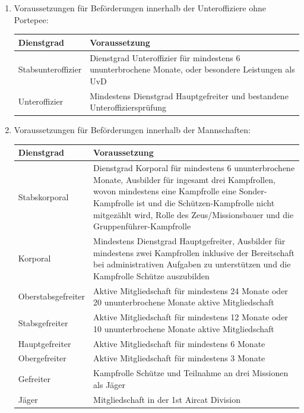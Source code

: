 \begin{enumerate}[label=(\arabic*)]
\begin{enumerate}[label=(\Alph*)]
\begin{center}
\begin{tabular}{|p{4cm}|p{8cm}|}
        \hline
        \end{tabular}
        \end{center}
        \item Voraussetzungen für Beförderungen innerhalb der Unteroffiziere ohne Portepee:
        \begin{center}
        \begin{tabular}{|p{4cm}|p{8cm}|}
        \hline
        \textbf{Dienstgrad} & \textbf{Voraussetzung} \\
        \hline
        Stabsunteroffizier & Dienstgrad Unteroffizier für mindestens 6 ununterbrochene Monate, oder besondere Leistungen als UvD \\
        \hline
        Unteroffizier & Mindestens Dienstgrad Hauptgefreiter und bestandene Unteroffiziersprüfung \\
        \hline
        \end{tabular}
        \end{center}
	\newpage
        \item Voraussetzungen für Beförderungen innerhalb der Mannschaften:
        \begin{center}
        \begin{tabular}{|p{4cm}|p{8cm}|}
        \hline
        \textbf{Dienstgrad} & \textbf{Voraussetzung} \\
        \hline
        Stabskorporal & Dienstgrad Korporal für mindestens 6 ununterbrochene Monate, Ausbilder für ingesamt drei Kampfrollen, wovon mindestens eine Kampfrolle eine Sonder-Kampfrolle ist und die Sch\"{u}tzen-Kampfrolle nicht mitgez\"{a}hlt wird, Rolle des Zeus/Missionsbauer und die Gruppenführer-Kampfrolle \\
        \hline
        Korporal & Mindestens Dienstgrad Hauptgefreiter, Ausbilder für mindestens zwei Kampfrollen inklusive der Bereitschaft bei administrativen Aufgaben zu unterstützen und die Kampfrolle Schütze auszubilden \\
        \hline
        Oberstabsgefreiter & Aktive Mitgliedschaft für mindestens 24 Monate oder 20 ununterbrochene Monate aktive Mitgliedschaft \\
        \hline
        Stabsgefreiter & Aktive Mitgliedschaft für mindestens 12 Monate oder 10 ununterbrochene Monate aktive Mitgliedschaft \\
        \hline
        Hauptgefreiter & Aktive Mitgliedschaft für mindestens 6 Monate \\
        \hline
        Obergefreiter & Aktive Mitgliedschaft für mindestens 3 Monate \\
        \hline
        Gefreiter & Kampfrolle Schütze und Teilnahme an drei Missionen als Jäger \\
        \hline
        Jäger & Mitgliedschaft in der 1st Aircat Division \\
        \hline
        \end{tabular}
        \end{center}
    \end{enumerate}
\end{enumerate}

\newpage
